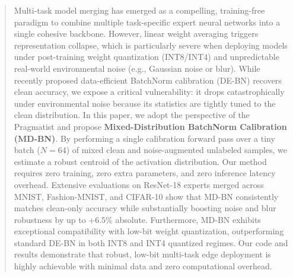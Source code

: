 \documentclass{article}
\theoremstyle{plain}
\theoremstyle{definition}
\theoremstyle{remark}
\begin{document}

\printAffiliationsAndNotice{}

\begin{abstract}
Multi-task model merging has emerged as a compelling, training-free paradigm to combine multiple task-specific expert neural networks into a single cohesive backbone. However, linear weight averaging triggers representation collapse, which is particularly severe when deploying models under post-training weight quantization (INT8/INT4) and unpredictable real-world environmental noise (e.g., Gaussian noise or blur). While recently proposed data-efficient BatchNorm calibration (DE-BN) recovers clean accuracy, we expose a critical vulnerability: it drops catastrophically under environmental noise because its statistics are tightly tuned to the clean distribution. In this paper, we adopt the perspective of the Pragmatist and propose \textbf{Mixed-Distribution BatchNorm Calibration (MD-BN)}. By performing a single calibration forward pass over a tiny batch ($N=64$) of mixed clean and noise-augmented unlabeled samples, we estimate a robust centroid of the activation distribution. Our method requires zero training, zero extra parameters, and zero inference latency overhead. Extensive evaluations on ResNet-18 experts merged across MNIST, Fashion-MNIST, and CIFAR-10 show that MD-BN consistently matches clean-only accuracy while substantially boosting noise and blur robustness by up to +6.5\% absolute. Furthermore, MD-BN exhibits exceptional compatibility with low-bit weight quantization, outperforming standard DE-BN in both INT8 and INT4 quantized regimes. Our code and results demonstrate that robust, low-bit multi-task edge deployment is highly achievable with minimal data and zero computational overhead.
\end{abstract}
\end{document}
